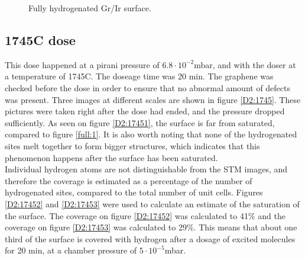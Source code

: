 \begin{figure}[H]
\caption{Fully hydrogenated Gr/Ir surface.}
\label{D2:full}
\end{figure}


\subsection{1745\degree C dose}

This dose happened at a pirani pressure of $6.8 \cdot 10^{-2}$mbar, and with the doser at a temperature of 1745\degree C. The doseage time was 20 min. The graphene was checked before the dose in order to ensure that no abnormal amount of defects was present. Three images at different scales are shown in figure \ref{D2:1745}. These pictures were taken right after the dose had ended, and the pressure dropped sufficiently. As seen on figure \ref{D2:17451}, the surface is far from saturated, compared to figure \ref{full:1}. It is also worth noting that none of the hydrogenated sites melt together to form bigger structures, which indicates that this phenomenon happens after the surface has been saturated.\\
Individual hydrogen atoms are not distinguishable from the STM images, and therefore the coverage is estimated as a percentage of the number of hydrogenated sites, compared to the total number of unit cells. Figures \ref{D2:17452} and \ref{D2:17453} were used to calculate an estimate of the saturation of the surface. The coverage on figure \ref{D2:17452} was calculated to 41\% and the coverage on figure \ref{D2:17453} was calculated to 29\%. This means that about one third of the surface is covered with hydrogen after a dosage of excited molecules for 20 min, at a chamber pressure of $5 \cdot 10^{-5}$mbar.

